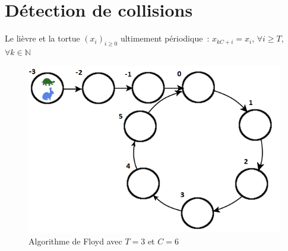 \documentclass{beamer}
\begin{document}
  \section{Détection de collisions}

  \begin{frame}{Le lièvre et la tortue}
    $(x_i)_{i \ge 0}$ ultimement périodique~: $x_{kC+i} = x_i$, $\forall i \geq T$, $\forall k \in \mathbb{N}$
    \begin{figure}
      \center{}
      \includegraphics[scale=0.5]{../rapport/images/Floyd.png}
      \caption{Algorithme de Floyd avec $T=3$ et $C=6$}
    \end{figure}
  \end{frame}
\end{document}

